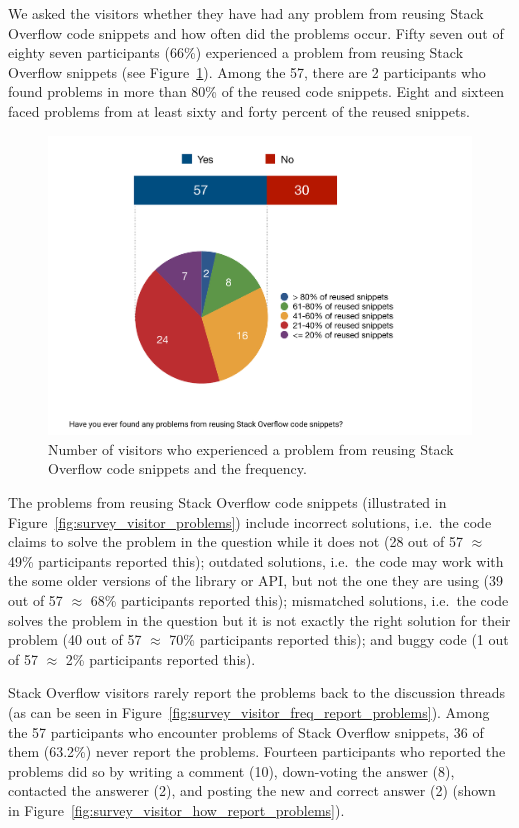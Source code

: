 \documentclass{svjour3}                     %
\begin{document}
We asked the visitors whether they have had any problem from reusing Stack Overflow
code snippets and how often did the problems occur.  Fifty seven out of eighty
seven participants (66\%) experienced a
problem from reusing Stack Overflow snippets (see Figure~\ref{fig:survey_v_problems}). Among the 57, there are 2
participants who found problems in more than 80\% of the reused code snippets.
Eight and sixteen faced problems from at least sixty and forty percent of the
reused snippets.


\begin{figure} \centering
	\includegraphics[width=.4\linewidth]{survey_v_problems} 
	\caption{Number of visitors who experienced a problem from reusing Stack Overflow code snippets and the frequency.}
	\label{fig:survey_v_problems} 
\end{figure}

The problems from reusing Stack Overflow code snippets (illustrated in
Figure~\ref{fig:survey_visitor_problems}) include incorrect solutions, i.e.~the
code claims to solve the problem in the question while it does not  (28 out of
57 $\approx$ 49\% participants reported this); outdated solutions, i.e.~the code
may work with the some older versions of the library or API, but not the one
they are using (39 out of 57 $\approx$ 68\% participants reported this);
mismatched solutions, i.e.~the code solves the problem in the question but it is
not exactly the right solution for their problem (40 out of 57 $\approx$ 70\%
participants reported this); and buggy code (1 out of 57 $\approx$ 2\%
participants reported this).

Stack Overflow visitors rarely report the problems back to the discussion
threads (as can be seen in
Figure~\ref{fig:survey_visitor_freq_report_problems}). Among the 57 participants
who encounter problems of Stack Overflow snippets, 36 of them (63.2\%) never
report the problems. Fourteen participants who reported the problems
did so by writing a comment (10), down-voting the answer (8), contacted the
answerer (2), and posting the new and correct answer (2) (shown in
Figure~\ref{fig:survey_visitor_how_report_problems}).
\end{document}
